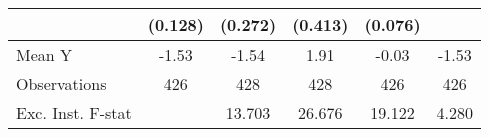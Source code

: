 {\begin{tabular}{l*{5}{c}}
            &     (0.128)         &     (0.272)         &     (0.413)         &     (0.076)         &                     \\
\midrule
Mean Y      &       -1.53         &       -1.54         &        1.91         &       -0.03         &       -1.53         \\
Observations&         426         &         428         &         428         &         426         &         426         \\
Exc. Inst. F-stat&                     &      13.703         &      26.676         &      19.122         &       4.280         \\
\bottomrule
\end{tabular}
}
